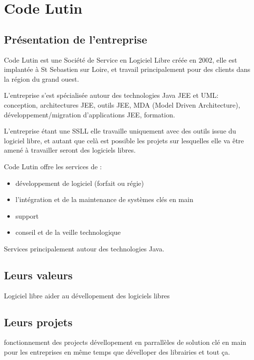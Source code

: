 \section{Code Lutin}

\subsection{Présentation de l'entreprise}


Code Lutin est une Société de Service en Logiciel Libre créée en 2002, elle est
implantée à St Sebastien sur Loire, et travail principalement pour des clients
dans la région du grand ouest.

L'entreprise s'est spécialisée autour des technologies Java JEE et UML:
conception, architectures JEE, outils JEE, MDA (Model Driven Architecture), 
développement/migration d’applications JEE, formation.

L'entreprise étant une SSLL elle travaille uniquement avec des outils issue du
logiciel libre, et autant que celà est possible les projets sur lesquelles elle
va être amené à travailler seront des logiciels libres.

Code Lutin offre les services de : 
\begin{itemize}
\item développement de logiciel (forfait ou régie)
\item l’intégration et de la maintenance de systèmes clés en main
\item support
\item conseil et de la veille technologique
\end{itemize}

Services principalement autour des technologies Java.




\subsection{Leurs valeurs}

Logiciel libre
aider au dévellopement des logiciels libres


\subsection{Leurs projets}

fonctionnement des projects 
dévellopement en parrallèles de solution clé en main pour 
les entreprises
en même temps que dévelloper des librairies
et tout ça.






